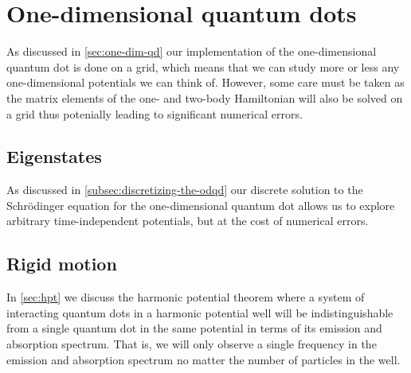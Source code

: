 \section{One-dimensional quantum dots}
    As discussed in \autoref{sec:one-dim-qd} our implementation of the
    one-dimensional quantum dot is done on a grid, which means that we can study
    more or less any one-dimensional potentials we can think of.
    However, some care must be taken as the matrix elements of the one- and
    two-body Hamiltonian will also be solved on a grid thus potenially leading
    to significant numerical errors.

    \subsection{Eigenstates}
        As discussed in \autoref{subsec:discretizing-the-odqd} our discrete
        solution to the Schrödinger equation for the one-dimensional quantum dot
        allows us to explore arbitrary time-independent potentials, but at the
        cost of numerical errors.

    \subsection{Rigid motion}
        In \autoref{sec:hpt} we discuss the harmonic potential theorem where a
        system of interacting quantum dots in a harmonic potential well will be
        indistinguishable from a single quantum dot in the same potential in
        terms of its emission and absorption spectrum.
        That is, we will only observe a single frequency in the emission and
        absorption spectrum no matter the number of particles in the well.
